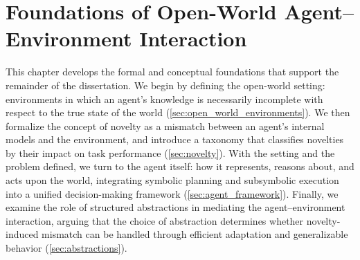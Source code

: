 %
%

\chapter[Foundations of Open-World Agent--Environment Interaction]{Foundations of Open-World Agent--Environment Interaction\footnotemark}
\label{ch:foundations}

This chapter develops the formal and conceptual foundations that support the remainder of the dissertation.
We begin by defining the open-world setting: environments in which an agent's knowledge is necessarily incomplete with respect to the true state of the world (\cref{sec:open_world_environments}). We then formalize the concept of novelty as a mismatch between an agent's internal models and the environment, and introduce a taxonomy that classifies novelties by their impact on task performance (\cref{sec:novelty}). With the setting and the problem defined, we turn to the agent itself: how it represents, reasons about, and acts upon the world, integrating symbolic planning and subsymbolic execution into a unified decision-making framework (\cref{sec:agent_framework}). Finally, we examine the role of structured abstractions in mediating the agent--environment interaction, arguing that the choice of abstraction determines whether novelty-induced mismatch can be handled through efficient adaptation and generalizable behavior (\cref{sec:abstractions}).

